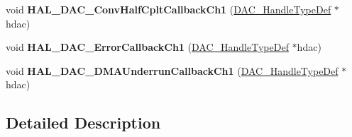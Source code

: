 \begin{DoxyCompactItemize}
void {\bfseries H\+A\+L\+\_\+\+D\+A\+C\+\_\+\+Conv\+Half\+Cplt\+Callback\+Ch1} (\mbox{\hyperlink{struct_d_a_c___handle_type_def}{D\+A\+C\+\_\+\+Handle\+Type\+Def}} $\ast$hdac)
\item 
\mbox{\label{group___d_a_c___exported___functions___group4_gad0600b00c0db84b0f77839860aa6e89d}} 
void {\bfseries H\+A\+L\+\_\+\+D\+A\+C\+\_\+\+Error\+Callback\+Ch1} (\mbox{\hyperlink{struct_d_a_c___handle_type_def}{D\+A\+C\+\_\+\+Handle\+Type\+Def}} $\ast$hdac)
\item 
\mbox{\label{group___d_a_c___exported___functions___group4_ga9fcdd9a69872883ea186dfe189495bf9}} 
void {\bfseries H\+A\+L\+\_\+\+D\+A\+C\+\_\+\+D\+M\+A\+Underrun\+Callback\+Ch1} (\mbox{\hyperlink{struct_d_a_c___handle_type_def}{D\+A\+C\+\_\+\+Handle\+Type\+Def}} $\ast$hdac)
\end{DoxyCompactItemize}


\subsection{Detailed Description}

